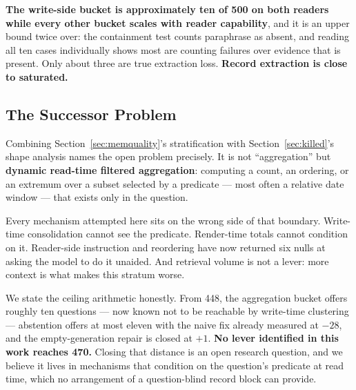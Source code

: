 \textbf{The write-side bucket is approximately ten of 500 on both readers while every other bucket scales with reader capability}, and it is an upper bound twice over: the containment test counts paraphrase as absent, and reading all ten cases individually shows most are counting failures over evidence that is present. Only about three are true extraction loss. \textbf{Record extraction is close to saturated.}

\subsection{The Successor Problem}

Combining Section~\ref{sec:memquality}'s stratification with Section~\ref{sec:killed}'s shape analysis names the open problem precisely. It is not ``aggregation'' but \textbf{dynamic read-time filtered aggregation}: computing a count, an ordering, or an extremum over a subset selected by a predicate --- most often a relative date window --- that exists only in the question.

Every mechanism attempted here sits on the wrong side of that boundary. Write-time consolidation cannot see the predicate. Render-time totals cannot condition on it. Reader-side instruction and reordering have now returned six nulls at asking the model to do it unaided. And retrieval volume is not a lever: more context is what makes this stratum worse.

We state the ceiling arithmetic honestly. From 448, the aggregation bucket offers roughly ten questions --- now known not to be reachable by write-time clustering --- abstention offers at most eleven with the naive fix already measured at $-28$, and the empty-generation repair is closed at $+1$. \textbf{No lever identified in this work reaches 470.} Closing that distance is an open research question, and we believe it lives in mechanisms that condition on the question's predicate at read time, which no arrangement of a question-blind record block can provide.

